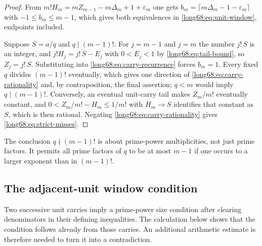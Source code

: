 \documentclass[11pt]{article}
\newcommand{\Ser}{S}
\begin{document}
\begin{proof}
From $m!H_m=mZ_{m-1}-m\Delta_m+1+\varepsilon_m$ one gets
$b_m=\lceil m\Delta_m-1-\varepsilon_m\rceil$ with $-1\le b_m\le m-1$, which
gives both equivalences in \eqref{long68:eq:unit-window}, endpoints included.

Suppose $\Ser=a/q$ and $q\mid(m-1)!$.  For $j=m-1$ and $j=m$ the number
$j!\,\Ser$ is an integer, and $j!H_j=j!\,\Ser-E_j$ with $0<E_j<1$ by
\eqref{long68:eq:tail-bound}, so $Z_j=j!\,\Ser$.  Substituting into
\eqref{long68:eq:carry-recurrence} forces $b_m=1$.  Every fixed $q$ divides
$(m-1)!$ eventually, which gives one direction of
\eqref{long68:eq:carry-rationality} and, by contraposition, the final assertion;
$q<m$ would imply $q\mid(m-1)!$.  Conversely, an eventual unit-carry tail
makes $Z_m/m!$ eventually constant, and $0<Z_m/m!-H_m\le1/m!$ with
$H_m\to\Ser$ identifies that constant as $\Ser$, which is then rational.
Negating \eqref{long68:eq:carry-rationality} gives \eqref{long68:eq:strict-misses}.
\end{proof}

The conclusion $q\nmid(m-1)!$ is about prime-power multiplicities, not
just prime factors. It permits all prime factors of $q$ to be at most
$m-1$ if one occurs to a larger exponent than in $(m-1)!$.

\subsection{The adjacent-unit window condition}
\label{long68:sec:adjacent-unit-no-go}

Two successive unit carries imply a prime-power size condition after
clearing denominators in their defining inequalities. The calculation
below shows that the condition follows already from those carries.
An additional arithmetic estimate is therefore needed to turn it into
a contradiction.
\end{document}

